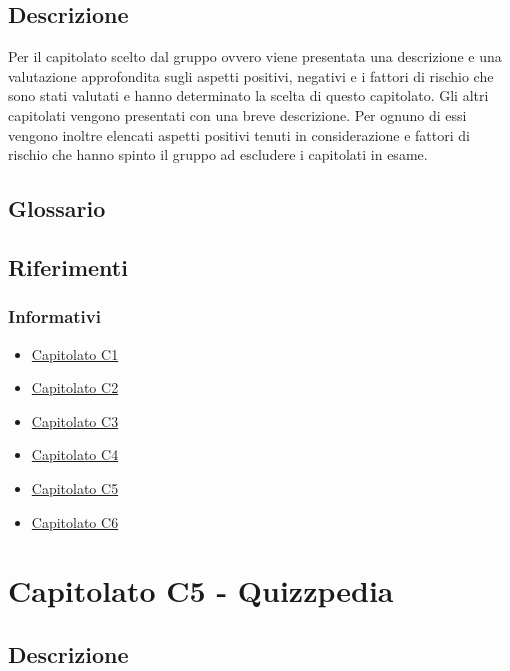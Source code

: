\documentclass[12pt,a4paper]{article}
\begin{document}
\subsection{Descrizione}
Per il capitolato scelto dal gruppo ovvero \prj viene presentata una descrizione e una valutazione approfondita sugli aspetti positivi, negativi e i fattori di rischio che sono stati valutati e hanno determinato la scelta di questo capitolato. Gli altri capitolati vengono presentati con una breve descrizione. Per ognuno di essi vengono inoltre elencati aspetti positivi tenuti in considerazione e fattori di rischio che hanno spinto il gruppo ad escludere i capitolati in esame.

\subsection{Glossario}
\glossarioPrint

\subsection{Riferimenti}
\subsubsection{Informativi}

\begin{itemize}
\item \href{http://www.math.unipd.it/~tullio/IS-1/2015/Progetto/C1.pdf}{Capitolato C1}
\item \href{http://www.math.unipd.it/~tullio/IS-1/2015/Progetto/C2.pdf}{Capitolato C2}
\item \href{http://www.math.unipd.it/~tullio/IS-1/2015/Progetto/C3.pdf}{Capitolato C3}
\item \href{http://www.math.unipd.it/~tullio/IS-1/2015/Progetto/C4.pdf}{Capitolato C4}
\item \href{http://www.math.unipd.it/~tullio/IS-1/2015/Progetto/C5.pdf}{Capitolato C5}
\item \href{http://www.math.unipd.it/~tullio/IS-1/2015/Progetto/C6.pdf}{Capitolato C6}
\end{itemize}


\newpage
\section{Capitolato C5 - Quizzpedia}
\subsection{Descrizione}
\end{document}
